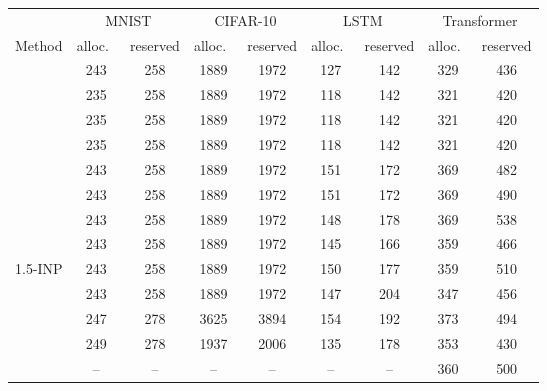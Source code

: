 \begin{tabular}{l cc cc cc cc}
\toprule
 & \multicolumn{2}{c}{MNIST} & \multicolumn{2}{c}{CIFAR-10} & \multicolumn{2}{c}{LSTM} & \multicolumn{2}{c}{Transformer} \\
\cmidrule(lr){2-3}\cmidrule(lr){4-5}\cmidrule(lr){6-7}\cmidrule(lr){8-9}
Method & alloc.\ & reserved & alloc.\ & reserved & alloc.\ & reserved & alloc.\ & reserved \\
\midrule
\BP{} & 243 & 258 & 1889 & 1972 & 127 & 142 & 329 & 436 \\
\SPSA{} & 235 & 258 & 1889 & 1972 & 118 & 142 & 321 & 420 \\
\SPSAb{} & 235 & 258 & 1889 & 1972 & 118 & 142 & 321 & 420 \\
\RS{} & 235 & 258 & 1889 & 1972 & 118 & 142 & 321 & 420 \\
\NP{} & 243 & 258 & 1889 & 1972 & 151 & 172 & 369 & 482 \\
\ANP{} & 243 & 258 & 1889 & 1972 & 151 & 172 & 369 & 490 \\
\ANPb{} & 243 & 258 & 1889 & 1972 & 148 & 178 & 369 & 538 \\
\INP{} & 243 & 258 & 1889 & 1972 & 145 & 166 & 359 & 466 \\
1.5-INP & 243 & 258 & 1889 & 1972 & 150 & 177 & 359 & 510 \\
\DUST{} & 243 & 258 & 1889 & 1972 & 147 & 204 & 347 & 456 \\
\DANP{} & 247 & 278 & 3625 & 3894 & 154 & 192 & 373 & 494 \\
\FF{} & 249 & 278 & 1937 & 2006 & 135 & 178 & 353 & 430 \\
\IPC{} & -- & -- & -- & -- & -- & -- & 360 & 500 \\
\bottomrule
\end{tabular}
